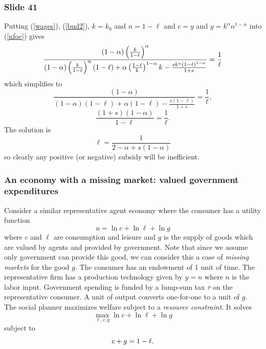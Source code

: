 \documentclass[aspectratio=169]{ltx-talk}
\begin{document}
\begin{frame}
\frametitle{Slide 41}
Putting (\ref{wages}), (\ref{bud2}), $k=k_{0}$ and $n=1-\ell $ and $c=y$ and 
$y=k^{\alpha }n^{1-\alpha }$ into (\ref{nfoc}) gives 
\begin{equation*}
\frac{\left( 1-\alpha \right) \left( \frac{k}{1-\ell }\right) ^{\alpha }}{%
\left( 1-\alpha \right) \left( \frac{k}{1-\ell }\right) ^{\alpha }\left(
1-\ell \right) +\alpha \left( \frac{1-\ell }{k}\right) ^{1-\alpha }k-\frac{%
sk^{\alpha }\left( 1-\ell \right) ^{1-\alpha }}{1+s}}=\frac{1}{\ell }
\end{equation*}%
which simplifies to 
\begin{equation*}
\frac{\left( 1-\alpha \right) }{\left( 1-\alpha \right) \left( 1-\ell
\right) +\alpha \left( 1-\ell \right) -\frac{s\left( 1-\ell \right) }{1+s}}=%
\frac{1}{\ell },
\end{equation*}%
\begin{equation*}
\frac{\left( 1+s\right) \left( 1-\alpha \right) }{1-\ell }=\frac{1}{\ell }.
\end{equation*}%
The solution is 
\begin{equation*}
\ell =\frac{1}{2-\alpha +s\left( 1-\alpha \right) }
\end{equation*}%
so clearly any positive (or negative) subsidy will be inefficient.
\end{frame}

\begin{frame}
\frametitle{An economy with a missing market: valued government expenditures}
Consider a similar representative agent economy where the consumer has a
utility function 
\begin{equation*}
u=\ln c+\ln \ell +\ln g
\end{equation*}%
where $c$ and $\ell $ are consumption and leisure and $g$ is the supply of
goods which are valued by agents and provided by government. Note that since
we assume only government can provide this good, we can consider this a case
of \textit{missing markets} for the good $g$. The consumer has an endowment
of 1 unit of time. The representative firm has a production technology given
by $y=n$ where $n$ is the labor input. Government spending is funded by a
lump-sum tax $\tau $ on the representative consumer. A unit of output
converts one-for-one to a unit of $g$. The social planner maximizes welfare
subject to a \textit{resource constraint}. It solves 
\begin{equation*}
\underset{\ell ,c,g}{\max }\ln c+\ln \ell +\ln g
\end{equation*}%
subject to%
\begin{equation}
c+g=1-\ell .  \notag
\end{equation}%
\end{frame}
\end{document}
